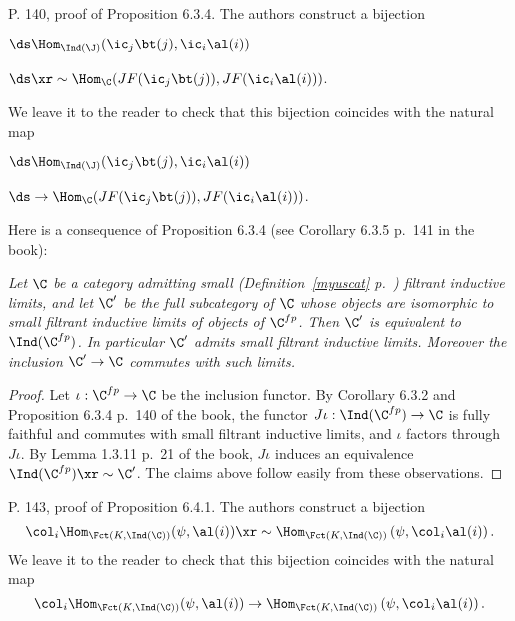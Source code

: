 \documentclass[12pt]{article}
\theoremstyle{remark}
\theoremstyle{definition}
\begin{document}
\begin{s}
P. 140, proof of Proposition 6.3.4. The authors construct a bijection 

$\ds\Hom_{\Ind(\J)}(\ic_j\bt(j),\ic_i\al(i))$

\hfill$\ds\xr\sim\Hom_\C(JF(\ic_j\bt(j)),JF(\ic_i\al(i)))$.
 
We leave it to the reader to check that this bijection coincides with the natural map 

$\ds\Hom_{\Ind(\J)}(\ic_j\bt(j),\ic_i\al(i))$

\hfill$\ds\to\Hom_\C(JF(\ic_j\bt(j)),JF(\ic_i\al(i)))$. 

Here is a consequence of Proposition 6.3.4 (see Corollary 6.3.5 p.~141 in the book):

\nn\emph{Let $\C$ be a category admitting small (Definition~\ref{myuscat} p.~) filtrant inductive limits, and let $\C'$ be the full subcategory of $\C$ whose objects are isomorphic to small filtrant inductive limits of objects of $\C^{fp}$. Then $\C'$ is equivalent to $\Ind(\C^{fp})$. In particular $\C'$ admits small filtrant inductive limits. Moreover the inclusion $\C'\to\C$ commutes with such limits.}

\begin{proof} 
Let $\iota:\C^{fp}\to\C$ be the inclusion functor. By Corollary 6.3.2 and Proposition 6.3.4 p.~140 of the book, the functor $J\iota:\Ind(\C^{fp})\to\C$ is fully faithful and commutes with small filtrant inductive limits, and $\iota$ factors through $J\iota$. By Lemma 1.3.11 p.~21 of the book, $J\iota$ induces an equivalence $\Ind(\C^{fp})\xr\sim\C'$. The claims above follow easily from these observations. 
\end{proof}
\end{s}

%

\begin{s}
P. 143, proof of Proposition 6.4.1. The authors construct a bijection 
$$
\col_i\Hom_{\Fct(K,\Ind(\C))}(\psi,\al(i))\xr\sim\Hom_{\Fct(K,\Ind(\C))}\left(\psi,\col_i\al(i)\right).
$$
We leave it to the reader to check that this bijection coincides with the natural map 
$$
\col_i\Hom_{\Fct(K,\Ind(\C))}(\psi,\al(i))\to\Hom_{\Fct(K,\Ind(\C))}\left(\psi,\col_i\al(i)\right).
$$
\end{s}

%
\end{document}
